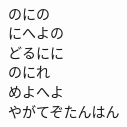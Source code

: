 \documentclass[10pt,b5j]{tarticle} %
\begin{document}
\begin{enumerate}
\begin{minipage}[c]{\blocksize}
        \vspace{\linespace}
        \item~\\
        のにの\\
        にへよの\\
        どるにに\\
        のにれ\\
        めよへよ\\
        やがてぞたんはん
    
    \end{minipage}
\end{enumerate} %
\end{document}
